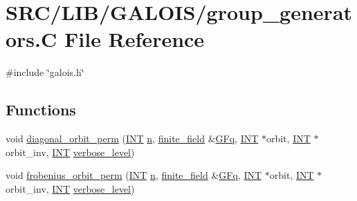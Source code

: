 \hypertarget{group__generators_8_c}{}\section{S\+R\+C/\+L\+I\+B/\+G\+A\+L\+O\+I\+S/group\+\_\+generators.C File Reference}
\label{group__generators_8_c}
{\ttfamily \#include \char`\"{}galois.\+h\char`\"{}}\newline
\subsection*{Functions}
\begin{DoxyCompactItemize}
\item 
void \mbox{\hyperlink{group__generators_8_c_aa6bbdf4744cf75e8f826e454ca163b31}{diagonal\+\_\+orbit\+\_\+perm}} (\mbox{\hyperlink{galois_8h_a09fddde158a3a20bd2dcadb609de11dc}{I\+NT}} \mbox{\hyperlink{simeon_8_c_a7f2cd26777ce0ff3fdaf8d02aacbddfb}{n}}, \mbox{\hyperlink{classfinite__field}{finite\+\_\+field}} \&\mbox{\hyperlink{discreta_8h_a3fcb7d3694a4550768d8b965fefd32eba6e13c8ed7fe701ffc7ff39e732eb6271}{G\+Fq}}, \mbox{\hyperlink{galois_8h_a09fddde158a3a20bd2dcadb609de11dc}{I\+NT}} $\ast$orbit, \mbox{\hyperlink{galois_8h_a09fddde158a3a20bd2dcadb609de11dc}{I\+NT}} $\ast$orbit\+\_\+inv, \mbox{\hyperlink{galois_8h_a09fddde158a3a20bd2dcadb609de11dc}{I\+NT}} \mbox{\hyperlink{simeon_8_c_a818073fbcc2f439e7c56952f67386122}{verbose\+\_\+level}})
\item 
void \mbox{\hyperlink{group__generators_8_c_a124056d24ceea20b62791e8f7b7dd7e3}{frobenius\+\_\+orbit\+\_\+perm}} (\mbox{\hyperlink{galois_8h_a09fddde158a3a20bd2dcadb609de11dc}{I\+NT}} \mbox{\hyperlink{simeon_8_c_a7f2cd26777ce0ff3fdaf8d02aacbddfb}{n}}, \mbox{\hyperlink{classfinite__field}{finite\+\_\+field}} \&\mbox{\hyperlink{discreta_8h_a3fcb7d3694a4550768d8b965fefd32eba6e13c8ed7fe701ffc7ff39e732eb6271}{G\+Fq}}, \mbox{\hyperlink{galois_8h_a09fddde158a3a20bd2dcadb609de11dc}{I\+NT}} $\ast$orbit, \mbox{\hyperlink{galois_8h_a09fddde158a3a20bd2dcadb609de11dc}{I\+NT}} $\ast$orbit\+\_\+inv, \mbox{\hyperlink{galois_8h_a09fddde158a3a20bd2dcadb609de11dc}{I\+NT}} \mbox{\hyperlink{simeon_8_c_a818073fbcc2f439e7c56952f67386122}{verbose\+\_\+level}})
\item 

\end{DoxyCompactItemize}
